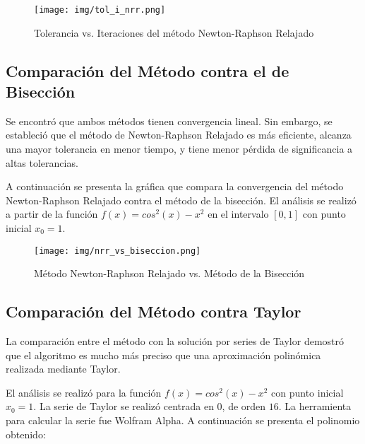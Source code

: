 \documentclass[a4paper,12pt]{article}
\begin{document}
\vspace{-1em}
\begin{figure}[ht!]
\centering
\texttt{[image: img/tol\_i\_nrr.png]}
\vspace{-1em}
\caption{Tolerancia vs. Iteraciones del método Newton-Raphson Relajado}
\label{fig:tol_i_nrr}
\end{figure}

\vspace{-1em}

\subsection{Comparación del Método contra el de Bisección}

Se encontró que ambos métodos tienen convergencia lineal. Sin embargo, se estableció que el método de Newton-Raphson Relajado es más eficiente, alcanza una mayor tolerancia en menor tiempo, y tiene menor pérdida de significancia a altas tolerancias. \par 

A continuación se presenta la gráfica que compara la convergencia del método Newton-Raphson Relajado contra el método de la bisección. El análisis se realizó a partir de la función $f(x)=cos^2(x)-x^2$ en el intervalo $[0,1]$ con punto inicial $x_0 = 1$. \par

\vspace{-1em}
\begin{figure}[ht!]
\centering
\texttt{[image: img/nrr\_vs\_biseccion.png]}
\vspace{-1em}
\caption{Método Newton-Raphson Relajado vs. Método de la Bisección}
\label{fig:nrr_biseccion}
\end{figure}

\newpage

\subsection{Comparación del Método contra Taylor}

La comparación entre el método con la solución por series de Taylor demostró que el algoritmo es mucho más preciso que una aproximación polinómica realizada mediante Taylor. \par 

El análisis se realizó para la función $f(x)=cos^2(x)-x^2$ con punto inicial $x_0 = 1$. La serie de Taylor se realizó centrada en $0$, de orden $16$. La herramienta para calcular la serie fue Wolfram Alpha. A continuación se presenta el polinomio obtenido: \par
\end{document}
